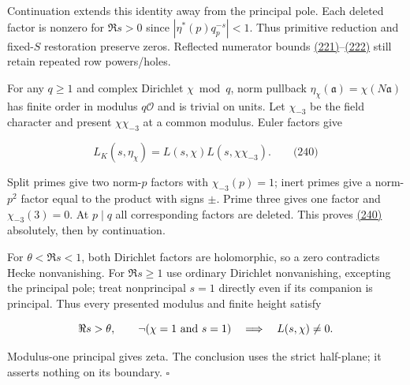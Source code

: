 Continuation extends this identity away from the principal pole. Each deleted factor is nonzero for \(\Re s>0\) since \(|\eta^*(p)q_p^{-s}|<1\). Thus primitive reduction and fixed-\(S\) restoration preserve zeros. Reflected numerator bounds \protect\hyperlink{dr:rowmass}{(221)}--\protect\hyperlink{dr:mass}{(222)} still retain repeated row powers/holes.

For any \(q\ge1\) and complex Dirichlet \(\chi\bmod q\), norm pullback \(\eta_\chi(\mathfrak a)=\chi(N\mathfrak a)\) has finite order in modulus \(q\mathcal O\) and is trivial on units. Let \(\chi_{-3}\) be the field character and present \(\chi\chi_{-3}\) at a common modulus. Euler factors give

\hypertarget{dr:norm-lift}{}

\label{dr:norm-lift}

\[
L_K(s,\eta_\chi)=L(s,\chi)L(s,\chi\chi_{-3}).
 \qquad\text{(240)}
\]

Split primes give two norm-\(p\) factors with \(\chi_{-3}(p)=1\); inert primes give a norm-\(p^2\) factor equal to the product with signs \(\pm\). Prime three gives one factor and \(\chi_{-3}(3)=0\). At \(p\mid q\) all corresponding factors are deleted. This proves \protect\hyperlink{dr:norm-lift}{(240)} absolutely, then by continuation.

For \(\theta<\Re s<1\), both Dirichlet factors are holomorphic, so a zero contradicts Hecke nonvanishing. For \(\Re s\ge1\) use ordinary Dirichlet nonvanishing, excepting the principal pole; treat nonprincipal \(s=1\) directly even if its companion is principal. Thus every presented modulus and finite height satisfy

\[
\Re s>\theta,\qquad
 \neg(\chi=1\ \hbox{and}\ s=1)
 \quad\Longrightarrow\quad L(s,\chi)\ne0.
\]

Modulus-one principal gives zeta. The conclusion uses the strict half-plane; it asserts nothing on its boundary. \(\square\)

